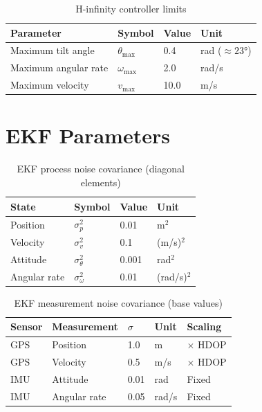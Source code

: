 \begin{table}[htbp]
    \centering
    \caption{H-infinity controller limits}
    \label{tab:hinf_limits}
    \begin{tabular}{@{}llll@{}}
        \toprule
        \textbf{Parameter} & \textbf{Symbol} & \textbf{Value} & \textbf{Unit} \\
        \midrule
        Maximum tilt angle & $\theta_{\max}$ & 0.4 & rad ($\approx 23°$) \\
        Maximum angular rate & $\omega_{\max}$ & 2.0 & rad/s \\
        Maximum velocity & $v_{\max}$ & 10.0 & m/s \\
        \bottomrule
    \end{tabular}
\end{table}

\section{EKF Parameters}

\begin{table}[htbp]
    \centering
    \caption{EKF process noise covariance (diagonal elements)}
    \label{tab:ekf_Q}
    \begin{tabular}{@{}llll@{}}
        \toprule
        \textbf{State} & \textbf{Symbol} & \textbf{Value} & \textbf{Unit} \\
        \midrule
        Position & $\sigma_p^2$ & 0.01 & m$^2$ \\
        Velocity & $\sigma_v^2$ & 0.1 & (m/s)$^2$ \\
        Attitude & $\sigma_\theta^2$ & 0.001 & rad$^2$ \\
        Angular rate & $\sigma_\omega^2$ & 0.01 & (rad/s)$^2$ \\
        \bottomrule
    \end{tabular}
\end{table}

\begin{table}[htbp]
    \centering
    \caption{EKF measurement noise covariance (base values)}
    \label{tab:ekf_R}
    \begin{tabular}{@{}lllll@{}}
        \toprule
        \textbf{Sensor} & \textbf{Measurement} & \textbf{$\sigma$} & \textbf{Unit} & \textbf{Scaling} \\
        \midrule
        GPS & Position & 1.0 & m & $\times$ HDOP \\
        GPS & Velocity & 0.5 & m/s & $\times$ HDOP \\
        IMU & Attitude & 0.01 & rad & Fixed \\
        IMU & Angular rate & 0.05 & rad/s & Fixed \\
        \bottomrule
    \end{tabular}
\end{table}

